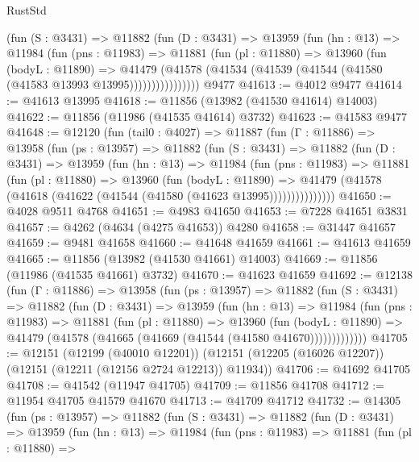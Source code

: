 \begin{lexlean}{RustStd}
\begin{coremodule}
            (fun (S : @3431) =>
            @11882
              (fun (D : @3431) =>
              @13959
                (fun (hn : @13) =>
                @11984
                  (fun (pns : @11983) =>
                  @11881
                    (fun (pl : @11880) =>
                    @13960
                      (fun (bodyL : @11890) =>
                      @41479
                        (@41578
                          (@41534 (@41539 (@41544 (@41580 (@41583 @13993 @13995))))))))))))))))
    @9477
@41613 := @4012 @9477
@41614 := @41613 @13995
@41618 := @11856 (@13982 (@41530 @41614) @14003)
@41622 := @11856 (@11986 (@41535 @41614) @3732)
@41623 := @41583 @9477
@41648 := @12120
    (fun (tail0 : @4027) =>
    @11887
      (fun (Γ : @11886) =>
      @13958
        (fun (ps : @13957) =>
        @11882
          (fun (S : @3431) =>
          @11882
            (fun (D : @3431) =>
            @13959
              (fun (hn : @13) =>
              @11984
                (fun (pns : @11983) =>
                @11881
                  (fun (pl : @11880) =>
                  @13960
                    (fun (bodyL : @11890) =>
                    @41479 (@41578 (@41618 (@41622 (@41544 (@41580 (@41623 @13995)))))))))))))))
@41650 := @4028 @9511 @4768
@41651 := @4983 @41650
@41653 := @7228 @41651 @3831
@41657 := @4262 (@4634 (@4275 @41653)) @4280
@41658 := @31447 @41657
@41659 := @9481 @41658
@41660 := @41648 @41659
@41661 := @41613 @41659
@41665 := @11856 (@13982 (@41530 @41661) @14003)
@41669 := @11856 (@11986 (@41535 @41661) @3732)
@41670 := @41623 @41659
@41692 := @12138
    (fun (Γ : @11886) =>
    @13958
      (fun (ps : @13957) =>
      @11882
        (fun (S : @3431) =>
        @11882
          (fun (D : @3431) =>
          @13959
            (fun (hn : @13) =>
            @11984
              (fun (pns : @11983) =>
              @11881
                (fun (pl : @11880) =>
                @13960
                  (fun (bodyL : @11890) =>
                  @41479 (@41578 (@41665 (@41669 (@41544 (@41580 @41670)))))))))))))
@41705 := @12151
    (@12199 (@40010 @12201))
    (@12151 (@12205 (@16026 @12207)) (@12151 (@12211 (@12156 @2724 @12213)) @11934))
@41706 := @41692 @41705
@41708 := @41542 (@11947 @41705)
@41709 := @11856 @41708
@41712 := @11954 @41705 @41579 @41670
@41713 := @41709 @41712
@41732 := @14305
    (fun (ps : @13957) =>
    @11882
      (fun (S : @3431) =>
      @11882
        (fun (D : @3431) =>
        @13959
          (fun (hn : @13) =>
          @11984
            (fun (pns : @11983) =>
            @11881
              (fun (pl : @11880) =>

\end{coremodule}
\end{lexlean}
